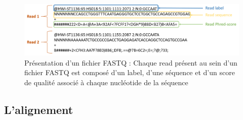 \documentclass[12pt,twoside]{ugathesis}
\theoremstyle{definition}
\theoremstyle{definition}
\theoremstyle{remark}
\begin{document}
\begin{figure}

{\centering \includegraphics[scale=.36]{figure/fastq} 

}

\caption[Présentation d'un fichier FASTQ]{Présentation d'un fichier FASTQ : Chaque read présent au sein d'un fichier FASTQ est composé d'un label, d'une séquence et d'un score de qualité associé à chaque nucléotide de la séquence}\label{fig:fastqformat}
\end{figure}

\newpage

\hypertarget{lalignement}{\subsection{L'alignement}\label{lalignement}}
\end{document}
